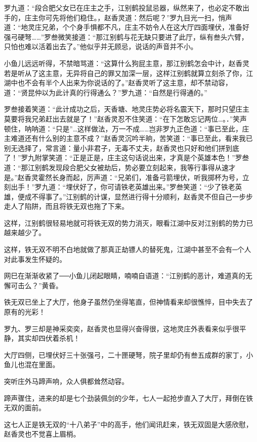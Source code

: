 \documentclass[12pt,oneside]{book}
\begin{document}
罗九道：``段合肥父女已在庄主之手，江别鹤投鼠忌器，纵然来了，也必定不敢出手的，庄主你可先将他们稳住。，赵香灵道：然后呢？''罗九目光一扫，悄声道：``地灵庄兄弟，个个身手惧都不凡，庄主不妨令人在这大厅四面埋伏，准备好强弓硬弩\ldots\ldots{}''罗叁微笑接道：``那江别鹤与花无缺只要进了此厅，纵有叁头六臂，只怕也难以活着出去了。''他似乎并无顾忌，说话的声音并不小。

小鱼儿远远听得，不禁暗骂道：``这算什么狗屁主意，那江别鹤怎会中计，赵香灵若是听从了这主意，无异将自己的罪又加深一层，这样江别鹤就算立刻杀了你，江湖中也不会有半个人出来为你说话的了。''赵香灵听了这主意，却不禁动容，道：``贤昆仲以为此计真的行得通么？''罗九道：``自然是行得通的。''

罗叁接着笑道：``此计成功之后，天香塘、地灵庄势必将名震天下，那时只望庄主莫要将我兄弟赶出去就是了！''赵香灵忍不住笑道：``在下怎敢忘记两位\ldots。．''笑声顿住，呐呐道：``只是''\ldots 这样做法，万一不成\ldots\ldots 岂非罗九正色道：``事已至此，庄主难道还有什么别的主意不成？''赵香灵沉吟半晌，苦笑道：``事已至此，看来我已别无选择了，常言道：量小非君子，无毒不丈夫，赵香灵也只好和他们拼到底了！''罗九附掌笑道：``正是正是，庄主这句话说出来，才真是个英雄本色！''罗叁道：``那江别鹤发现段合肥父女被劫后，势必要立刻起来，我等行事得从速才是。''赵香灵霍然长身而起，厉声道：``兄弟们，准备弓箭埋伏，听我掷杯为号，立刻出手！''罗九道：``埋伏好了，你可请铁老英雄出来。''罗叁笑道：``少了铁老英雄，便成不得事了。''江别鹤的计谋，显然进行得十分顺利，赵香灵不但自己一步步走人了陷阱，而且将铁无双也拖了下来。

这样，江别鹤很轻易地就可将铁无双的势力消灭，眼看江湖中反对江别鹤的势力已越来越少了。

这样，铁无双不明不白地就做了那真正劫镖人的替死鬼，江湖中甚至不会有─个人对此事发生怀疑的。

网巳在渐渐收紧了──小鱼儿闭起眼睛，喃喃自语道：``江别鹤的恶计，难道真的无懈可击么？''黄昏。

铁无双已坐上了大厅，他身子虽然仍坐得笔直，但神情看来却很憔悴，目中失去了原有的光彩！

罗九、罗三却是神采奕奕，赵香灵也显得兴奋得很，这地灵庄外表看来似乎很平静，其实却四伏着杀机！

大厅四侧，已埋伏好三十张强弓，二十匣硬弩，院子里却仍有叁五成群的家丁，小鱼儿也混在里面。

突听庄外马蹄声响，众人俱都耸然动容。

蹄声骤住，进来的却是七个劲装佩剑的少年，七人一起抢步直入了大厅，拜倒在铁无双的面前。

这七人正是铁无双的``十八弟子''中的高手，他们闻讯赶来，铁无双固是大感欣慰，赵香灵也不觉喜上眉梢。
\end{document}
